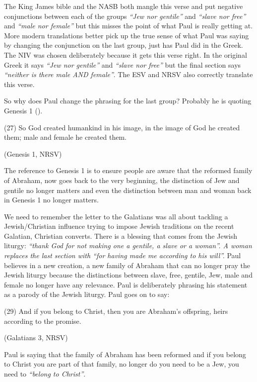\documentclass[a5paper, openany, oneside, pagesize,
headings=standardclasses, chapterprefix=false]{scrbook}
\begin{document}
The King James bible and the NASB both mangle this verse and put negative conjunctions
between each of the groups \emph{``Jew nor gentile''} and \emph{``slave
  nor free''} and \emph{``male nor female''} but this misses the point
of what Paul is really getting at. More modern translations better
pick up the true sense of what Paul was saying by changing the
conjunction on the last group, just has Paul did in the Greek. The NIV was chosen deliberately because it gets this verse right.
In the original Greek it says \emph{``Jew nor gentile''} and \emph{``slave
  nor free''} but the final section says \emph{``neither is there male
  AND female''}. The ESV and NRSV also correctly translate this verse.

So why does Paul change the phrasing for the last group? Probably he
is quoting Genesis 1 (\cite{Wright2004}).

\begin{myquote}
(27) So God created humankind in his image,
in the image of God he created them;
male and female he created them.

(Genesis 1, NRSV)
\end{myquote}

The reference to Genesis 1 is to ensure people are aware that the
reformed family of Abraham, now goes back to the
very beginning, the distinction of Jew and gentile no longer matters
and even the distinction between man and woman back in Genesis 1 no
longer matters.   

We need to remember the letter to the Galatians was all about tackling
a Jewish/Christian influence trying to impose Jewish traditions on the
recent Galatian, Christian converts. There is a blessing that comes from the Jewish liturgy: \emph{``thank God for not making one a gentile, a slave or a woman''. A woman
  replaces the last section with ``for having made me according to his
  will''.} Paul believes in a new creation, a new family of Abraham
that can no longer pray the Jewish liturgy because the distinctions
between slave, free, gentile, Jew, male and female no longer have any
relevance. Paul is deliberately phrasing his statement as a parody of
the Jewish liturgy. Paul goes on to say:

\begin{myquote}
(29) And if you belong to Christ, then you are Abraham’s offspring, heirs according to the promise.

(Galatians 3, NRSV)
\end{myquote}

Paul is saying that the family of Abraham has been reformed and if you
belong to Christ you are part of that family, no longer do you need to
be a Jew, you need to \emph{``belong to Christ''}.
\end{document}
